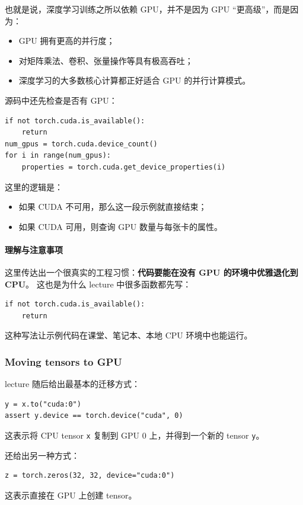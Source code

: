 \documentclass[a4paper,UTF8]{article}
\numberwithin{equation}{section}
\begin{document}
也就是说，深度学习训练之所以依赖 GPU，并不是因为 GPU ``更高级''，而是因为：
\begin{itemize}
    \item GPU 拥有更高的并行度；
    \item 对矩阵乘法、卷积、张量操作等具有极高吞吐；
    \item 深度学习的大多数核心计算都正好适合 GPU 的并行计算模式。
\end{itemize}

源码中还先检查是否有 GPU：
\begin{verbatim}
if not torch.cuda.is_available():
    return
num_gpus = torch.cuda.device_count()
for i in range(num_gpus):
    properties = torch.cuda.get_device_properties(i)
\end{verbatim}

这里的逻辑是：
\begin{itemize}
    \item 如果 CUDA 不可用，那么这一段示例就直接结束；
    \item 如果 CUDA 可用，则查询 GPU 数量与每张卡的属性。
\end{itemize}

\paragraph{理解与注意事项}
这里传达出一个很真实的工程习惯：\textbf{代码要能在没有 GPU 的环境中优雅退化到 CPU}。  
这也是为什么 lecture 中很多函数都先写：
\begin{verbatim}
if not torch.cuda.is_available():
    return
\end{verbatim}
这种写法让示例代码在课堂、笔记本、本地 CPU 环境中也能运行。

\subsubsection{Moving tensors to GPU}

lecture 随后给出最基本的迁移方式：
\begin{verbatim}
y = x.to("cuda:0")
assert y.device == torch.device("cuda", 0)
\end{verbatim}

这表示将 CPU tensor \verb|x| 复制到 GPU 0 上，并得到一个新的 tensor \verb|y|。

还给出另一种方式：
\begin{verbatim}
z = torch.zeros(32, 32, device="cuda:0")
\end{verbatim}

这表示直接在 GPU 上创建 tensor。
\end{document}
